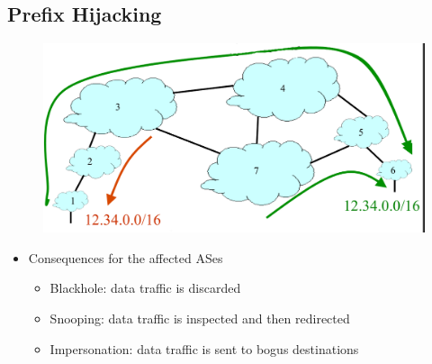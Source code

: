 \subsection{Prefix Hijacking}
\begin{figure}[H]
    \includegraphics[scale=0.5]{lazy/prefixhijacking.png}
\end{figure}
\begin{itemize}
    \item Consequences for the affected ASes
          \begin{itemize}
              \item Blackhole: data traffic is discarded
              \item Snooping: data traffic is inspected and then redirected
              \item Impersonation: data traffic is sent to bogus destinations
          \end{itemize}
\end{itemize}


